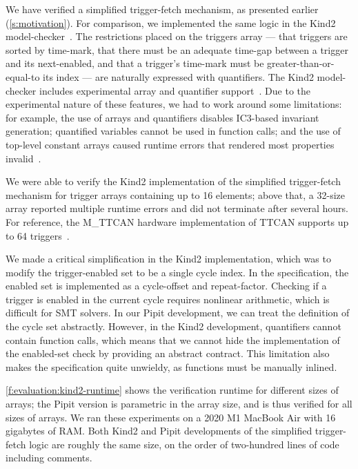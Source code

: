 We have verified a simplified trigger-fetch mechanism, as presented earlier (\autoref{s:motivation}).
For comparison, we implemented the same logic in the Kind2 model-checker~\cite{champion2016kind2}.
The restrictions placed on the triggers array --- that triggers are sorted by time-mark, that there must be an adequate time-gap between a trigger and its next-enabled, and that a trigger's time-mark must be greater-than-or-equal-to its index --- are naturally expressed with quantifiers.
The Kind2 model-checker includes experimental array and quantifier support~\cite{kind2userdoc}.
Due to the experimental nature of these features, we had to work around some limitations: for example, the use of arrays and quantifiers disables IC3-based invariant generation; quantified variables cannot be used in function calls; and the use of top-level constant arrays caused runtime errors that rendered most properties invalid~\cite{kind2024toparray}.

We were able to verify the Kind2 implementation of the simplified trigger-fetch mechanism for trigger arrays containing up to 16 elements; above that, a 32-size array reported multiple runtime errors and did not terminate after several hours.
For reference, the M_TTCAN hardware implementation of TTCAN supports up to 64 triggers~\cite{bosch2019mttcan}.

We made a critical simplification in the Kind2 implementation, which was to modify the trigger-enabled set to be a single cycle index.
In the specification, the enabled set is implemented as a cycle-offset and repeat-factor.
Checking if a trigger is enabled in the current cycle requires nonlinear arithmetic, which is difficult for SMT solvers.
In our Pipit development, we can treat the definition of the cycle set abstractly.
However, in the Kind2 development, quantifiers cannot contain function calls, which means that we cannot hide the implementation of the enabled-set check by providing an abstract contract.
This limitation also makes the specification quite unwieldy, as functions must be manually inlined.

\autoref{f:evaluation:kind2-runtime} shows the verification runtime for different sizes of arrays; the Pipit version is parametric in the array size, and is thus verified for all sizes of arrays.
We ran these experiments on a 2020 M1 MacBook Air with 16 gigabytes of RAM.
Both Kind2 and Pipit developments of the simplified trigger-fetch logic are roughly the same size, on the order of two-hundred lines of code including comments.

